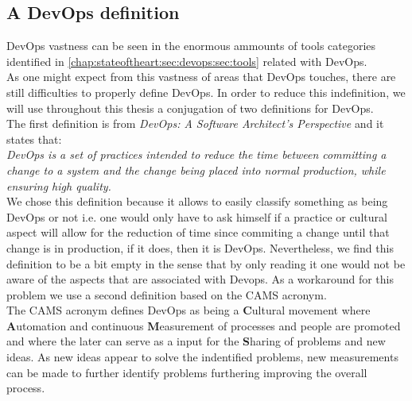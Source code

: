         \subsection{A DevOps definition} \label{chap:stateoftheart:sec:devops:sec:definition}
        DevOps vastness can be seen in the enormous ammounts of tools categories identified in \ref{chap:stateoftheart:sec:devops:sec:tools} related with DevOps.\\
        As one might expect from this vastness of areas that DevOps touches, there are still difficulties to properly define DevOps. In order to reduce this indefinition, we will use throughout this thesis a conjugation of two definitions for DevOps.\\
        The first definition is from \textit{DevOps: A Software Architect's Perspective} \cite{Bass} and it states that: \\
        \textit{DevOps is a set of practices intended to reduce the time between committing a change to a system and the change being placed into normal production, while ensuring high quality.} \\
        We chose this definition because it allows to easily classify something as being DevOps or not i.e. one would only have to ask himself if a practice or cultural aspect will allow for the reduction of time since commiting a change until that change is in production, if it does, then it is DevOps. Nevertheless, we find this definition to be a bit empty in the sense that by only reading it one would not be aware of the aspects that are associated with Devops. As a workaround for this problem we use a second definition based on the CAMS acronym.\\
        The CAMS acronym \cite{Willis2010} defines DevOps as being a \textbf{C}ultural movement where \textbf{A}utomation and continuous \textbf{M}easurement of processes and people are promoted and where the later can serve as a input for the \textbf{S}haring of problems and new ideas. As new ideas appear to solve the indentified problems, new measurements can be made to further identify problems furthering improving the overall process.


